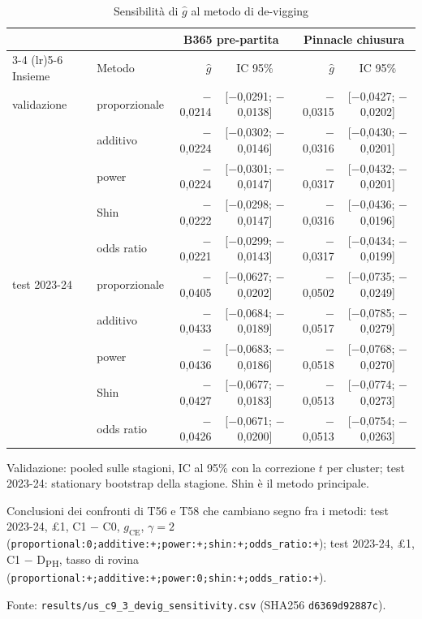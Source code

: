 \begin{table}[htbp]
\centering
\small
\caption{Sensibilità di $\hat g$ al metodo di de-vigging}
\label{tab:s11_devig}
\begin{tabular}{llrcrc}
\toprule
 &  & \multicolumn{2}{c}{B365 pre-partita} & \multicolumn{2}{c}{Pinnacle chiusura} \\
\cmidrule(lr){3-4} \cmidrule(lr){5-6}
Insieme & Metodo & $\hat g$ & IC 95\% & $\hat g$ & IC 95\% \\
\midrule
validazione & proporzionale & $-$0,0214 & [$-$0,0291; $-$0,0138] & $-$0,0315 & [$-$0,0427; $-$0,0202] \\
 & additivo & $-$0,0224 & [$-$0,0302; $-$0,0146] & $-$0,0316 & [$-$0,0430; $-$0,0201] \\
 & power & $-$0,0224 & [$-$0,0301; $-$0,0147] & $-$0,0317 & [$-$0,0432; $-$0,0201] \\
 & Shin & $-$0,0222 & [$-$0,0298; $-$0,0147] & $-$0,0316 & [$-$0,0436; $-$0,0196] \\
 & odds ratio & $-$0,0221 & [$-$0,0299; $-$0,0143] & $-$0,0317 & [$-$0,0434; $-$0,0199] \\
\midrule
test 2023-24 & proporzionale & $-$0,0405 & [$-$0,0627; $-$0,0202] & $-$0,0502 & [$-$0,0735; $-$0,0249] \\
 & additivo & $-$0,0433 & [$-$0,0684; $-$0,0189] & $-$0,0517 & [$-$0,0785; $-$0,0279] \\
 & power & $-$0,0436 & [$-$0,0683; $-$0,0186] & $-$0,0518 & [$-$0,0768; $-$0,0270] \\
 & Shin & $-$0,0427 & [$-$0,0677; $-$0,0183] & $-$0,0513 & [$-$0,0774; $-$0,0273] \\
 & odds ratio & $-$0,0426 & [$-$0,0671; $-$0,0200] & $-$0,0513 & [$-$0,0754; $-$0,0263] \\
\bottomrule
\end{tabular}

\smallskip
\begin{minipage}{\linewidth}
\footnotesize
Validazione: pooled sulle stagioni, IC al 95\% con la correzione $t$ per cluster; test 2023-24: stationary bootstrap della stagione. Shin è il metodo principale.\par
Conclusioni dei confronti di T56 e T58 che cambiano segno fra i metodi: test 2023-24, \pounds{}1, C1 $-$ C0, $g_{\mathrm{CE}}$, $\gamma = 2$ (\texttt{proportional:0;additive:+;power:+;shin:+;odds\_ratio:+}); test 2023-24, \pounds{}1, C1 $-$ D\textsubscript{PH}, tasso di rovina (\texttt{proportional:+;additive:+;power:0;shin:+;odds\_ratio:+}).\par
Fonte: \texttt{results/us\_c9\_3\_devig\_sensitivity.csv} (SHA256 \texttt{d6369d92887c}).
\end{minipage}
\end{table}
